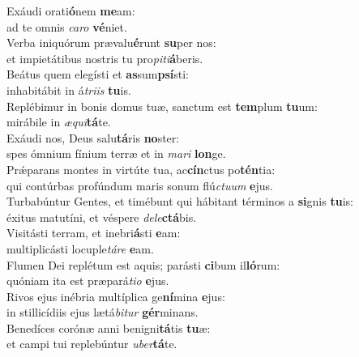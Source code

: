 \evenverse Exáudi orati\textbf{ó}nem \textbf{me}am:~\*\\
\evenverse ad te omnis \textit{ca}\textit{ro} \textbf{vé}niet.\\
\oddverse Verba iniquórum prævalu\textbf{é}runt \textbf{su}per nos:~\*\\
\oddverse et impietátibus nostris tu pro\textit{pi}\textit{ti}\textbf{á}beris.\\
\evenverse Beátus quem elegísti et \textbf{as}sum\textbf{psí}sti:~\*\\
\evenverse inhabitábit in á\textit{tri}\textit{is} \textbf{tu}is.\\
\oddverse Replébimur in bonis domus tuæ, sanctum est \textbf{tem}plum \textbf{tu}um:~\*\\
\oddverse mirábile in \textit{æ}\textit{qui}\textbf{tá}te.\\
\evenverse Exáudi nos, Deus salu\textbf{tá}ris \textbf{no}ster:~\*\\
\evenverse spes ómnium fínium terræ et in \textit{ma}\textit{ri} \textbf{lon}ge.\\
\oddverse Prǽparans montes in virtúte tua, ac\textbf{cín}ctus po\textbf{tén}tia:~\*\\
\oddverse qui contúrbas profúndum maris sonum flú\textit{ctu}\textit{um} \textbf{e}jus.\\
\evenverse Turbabúntur Gentes, et timébunt qui hábitant términos a \textbf{si}gnis \textbf{tu}is:~\*\\
\evenverse éxitus matutíni, et véspere \textit{de}\textit{le}\textbf{ctá}bis.\\
\oddverse Visitásti terram, et inebri\textbf{á}sti \textbf{e}am:~\*\\
\oddverse multiplicásti locuple\textit{tá}\textit{re} \textbf{e}am.\\
\evenverse Flumen Dei replétum est aquis; parásti \textbf{ci}bum il\textbf{ló}rum:~\*\\
\evenverse quóniam ita est præpará\textit{ti}\textit{o} \textbf{e}jus.\\
\oddverse Rivos ejus inébria multíplica ge\textbf{ní}mina \textbf{e}jus:~\*\\
\oddverse in stillicídiis ejus lætá\textit{bi}\textit{tur} \textbf{gér}minans.\\
\evenverse Benedíces corónæ anni benigni\textbf{tá}tis \textbf{tu}æ:~\*\\
\evenverse et campi tui replebúntur \textit{u}\textit{ber}\textbf{tá}te.\\
